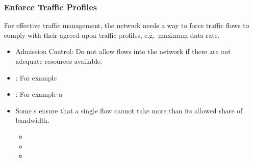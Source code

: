 \subsubsection{Enforce Traffic Profiles}\label{subsubsec:Enforce_Traffic_Profiles}
For effective traffic management, the network needs a way to force traffic flows to comply with their agreed-upon traffic profiles, e.g.\ maximum data rate.
\begin{itemize}[noitemsep]
\item Admission Control: Do not allow flows into the network if there are not adequate resources available.
\item {}: For example 
\item {}: For example a 
\item Some s ensure that a single flow cannot take more than its allowed share of bandwidth.
  \begin{itemize}[noitemsep]
  \item {}
  \item {}
  \item {}
  \end{itemize}
\end{itemize}






